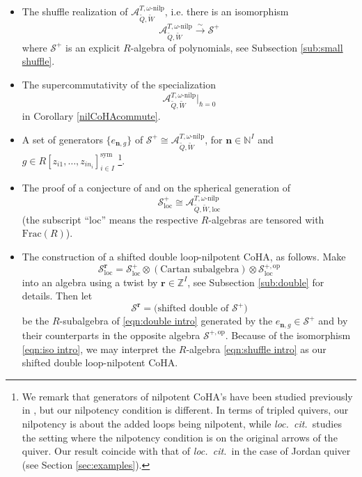 \documentclass{amsart}
\def\CS{{\mathcal{S}}}
\def\sym{\textrm{sym}}
\def\br{{\mathbf{r}}}
\def\nn{{\mathbb{N}^I}}
\def\zz{{\mathbb{Z}^I}}
\def\bn{{\boldsymbol{n}}}
\def\loccit{\emph{loc.~cit.~}}
\def\tQ{\tilde{Q}}
\def\tW{\tilde{W}}
\def\ring{R}
\def\kha{\mathcal{A}^{T,\omega\text{-nilp}}_{\tQ,\tW}}
\def\khaloc{\mathcal{A}^{T,\omega\text{-nilp}}_{\tQ,\tW,\text{loc}}}
\begin{document}
\medskip 

\begin{itemize}[leftmargin=*]

\item The shuffle realization of $\kha$, i.e. there is an isomorphism
\begin{equation}
\label{eqn:iso intro}
\kha \xrightarrow{\sim} \CS^+
\end{equation}
where $\CS^+$ is an explicit $\ring$-algebra of polynomials, see Subsection \ref{sub:small shuffle}. 

\medskip 

\item The supercommutativity of the specialization
$$
\kha \Big|_{\hbar = 0}
$$
in Corollary \ref{nilCoHAcommute}.

\medskip 

\item A set of generators $\{e_{\bn,g}\}$ of $\CS^+ \cong \kha$, for $\bn \in \nn$ and $g \in \ring[z_{i1},\dots,z_{in_i}]_{i\in I}^{\sym}$ \footnote{We remark that generators of nilpotent CoHA's have been studied previously in \cite{schiffmanncohagenerators}, but our nilpotency condition is different. In terms of tripled quivers, our nilpotency is about the added loops being nilpotent, while \loccit studies the setting where the nilpotency condition is on the original arrows of the quiver. Our result coincide with that of \loccit in the case of Jordan quiver (see Section \ref{sec:examples}).}.

\medskip 

\item The proof of a conjecture of \cite{jindalnegutbps} and \cite{NGen} on the spherical generation of 
$$
\CS^+_{\text{loc}} \cong \khaloc
$$
(the subscript ``loc'' means the respective $\ring$-algebras are tensored with $\text{Frac}(\ring)$).

\medskip 

\item The construction of a shifted double loop-nilpotent CoHA, as follows. Make
\begin{equation}
\label{eqn:double intro}
\CS^{\br}_{\text{loc}} = \CS^+_{\text{loc}} \otimes (\text{Cartan subalgebra}) \otimes \CS^{+,\text{op}}_{\text{loc}}
\end{equation}
into an algebra using a twist by $\br \in \zz$, see Subsection \ref{sub:double} for details. Then let
\begin{equation}
\label{eqn:shuffle intro}
\CS^{\br} = \Big(\text{shifted double of }\CS^+ \Big)
\end{equation}
be the $\ring$-subalgebra of \eqref{eqn:double intro} generated by the $e_{\bn,g} \in \CS^+$ and by their counterparts in the opposite algebra $\CS^{+,\text{op}}$. Because of the isomorphism \eqref{eqn:iso intro}, we may interpret the $\ring$-algebra \eqref{eqn:shuffle intro} as our shifted double loop-nilpotent CoHA.


\end{itemize}
\end{document}
